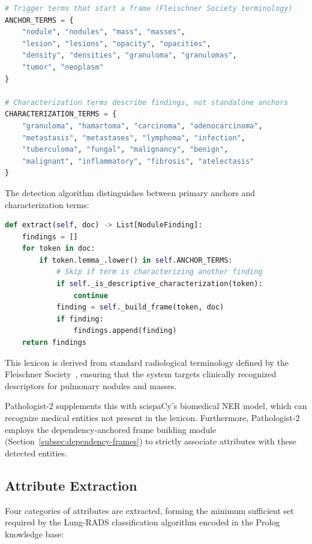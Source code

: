 \documentclass[12pt]{article}
\begin{document}
\begin{lstlisting}[language=Python, caption={Anchor terms for nodule detection.}]
# Trigger terms that start a frame (Fleischner Society terminology)
ANCHOR_TERMS = {
    "nodule", "nodules", "mass", "masses", 
    "lesion", "lesions", "opacity", "opacities",
    "density", "densities", "granuloma", "granulomas",
    "tumor", "neoplasm"
}

# Characterization terms describe findings, not standalone anchors
CHARACTERIZATION_TERMS = {
    "granuloma", "hamartoma", "carcinoma", "adenocarcinoma",
    "metastasis", "metastases", "lymphoma", "infection",
    "tuberculoma", "fungal", "malignancy", "benign",
    "malignant", "inflammatory", "fibrosis", "atelectasis"
}
\end{lstlisting}

The detection algorithm distinguishes between primary anchors and characterization terms:

\begin{lstlisting}[language=Python, caption={Anchor detection with characterization filtering.}]
def extract(self, doc) -> List[NoduleFinding]:
    findings = []
    for token in doc:
        if token.lemma_.lower() in self.ANCHOR_TERMS:
            # Skip if term is characterizing another finding
            if self._is_descriptive_characterization(token):
                continue
            finding = self._build_frame(token, doc)
            if finding:
                findings.append(finding)
    return findings
\end{lstlisting}

This lexicon is derived from standard radiological terminology defined by the Fleischner Society~\cite{hansell2008fleischner}, ensuring that the system targets clinically recognized descriptors for pulmonary nodules and masses.

Pathologist-2 supplements this with scispaCy's biomedical NER model, which can recognize medical entities not present in the lexicon. Furthermore, Pathologist-2 employs the dependency-anchored frame building module (Section~\ref{subsec:dependency-frames}) to strictly associate attributes with these detected entities.

\subsection{Attribute Extraction}
\label{subsec:attribute-extraction}

Four categories of attributes are extracted, forming the minimum sufficient set required by the Lung-RADS classification algorithm encoded in the Prolog knowledge base:
\end{document}
